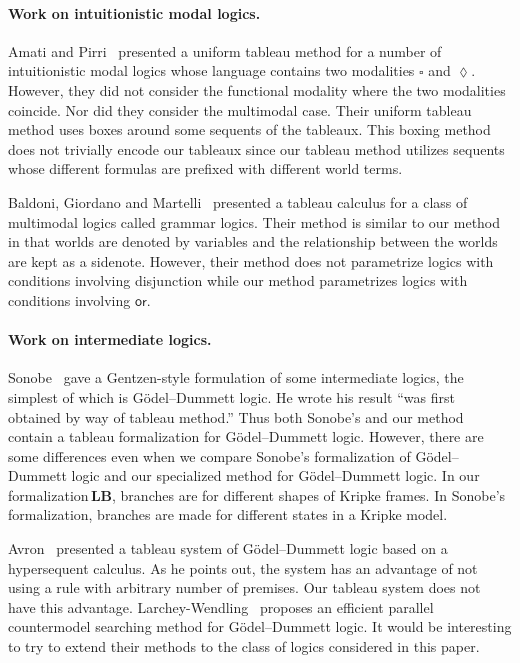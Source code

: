 \documentclass[doctor]{iscs-thesis}
\newcommand{\LB}{\textbf{LB}}
\newcommand{\wor}{\mathsf{{or}}}
\begin{document}
\paragraph{Work on intuitionistic modal logics.}

Amati and Pirri~\cite{amati94} presented a uniform tableau method for a number of
intuitionistic modal logics whose language contains two modalities
$\square$ and $\lozenge$.
However, they did not consider the functional modality where the two
modalities coincide.  Nor did they consider the multimodal case.
Their uniform tableau method uses boxes around some sequents of the
tableaux.  This boxing method does not trivially encode our tableaux since our
tableau method utilizes sequents whose different formulas are prefixed
with different world terms.

Baldoni, Giordano and Martelli~\cite{baldoni98} presented a tableau
calculus for a class of multimodal logics called grammar logics.
Their method is similar to our method in that worlds are denoted by
variables and the relationship between the worlds are kept as a
sidenote.
However, their method does not parametrize logics with conditions involving
disjunction while our method parametrizes logics with conditions
involving $\wor$.

\paragraph{Work on intermediate logics.}

Sonobe~\cite{sonobe} gave a Gentzen-style formulation of some
intermediate logics, the simplest of which is G\"{o}del--Dummett logic.
He wrote his result ``was first obtained by way of tableau method.''
Thus both Sonobe's and our method contain a tableau formalization for
G\"{o}del--Dummett logic.  However, there are some differences even when
we compare Sonobe's formalization of G\"odel--Dummett logic and our
specialized method for G\"odel--Dummett logic.
In our formalization\,\LB, branches are for different shapes of Kripke
frames.  In Sonobe's formalization, branches are made for different
states in a Kripke model.

Avron~\cite{avron2000} presented a tableau system of G\"odel--Dummett logic
based on a hypersequent calculus.
As he points out, the system has an advantage of not using a rule with
arbitrary number of
premises.  Our tableau system does not have this advantage.
Larchey-Wendling~\cite{countermodelsearch} proposes an efficient parallel
countermodel searching method for G\"odel--Dummett logic.
It would be interesting to try to extend their methods to the
class of logics considered in this paper.
\end{document}
